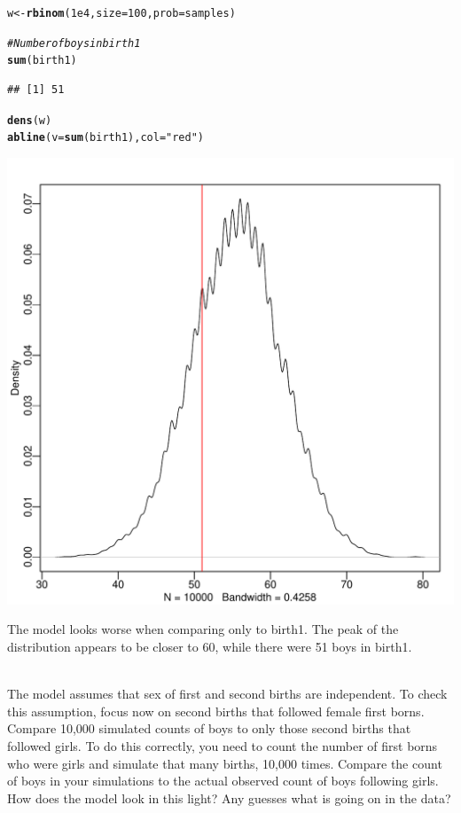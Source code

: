 \documentclass[12pt]{article}\usepackage[]{graphicx}\usepackage[]{color}
\makeatletter
\def\maxwidth{ %
  \ifdim\Gin@nat@width>\linewidth
    \linewidth
  \else
    \Gin@nat@width
  \fi
}
\newcommand{\hlnum}[1]{\textcolor[rgb]{0.686,0.059,0.569}{#1}}%
\newcommand{\hlstr}[1]{\textcolor[rgb]{0.192,0.494,0.8}{#1}}%
\newcommand{\hlcom}[1]{\textcolor[rgb]{0.678,0.584,0.686}{\textit{#1}}}%
\newcommand{\hlstd}[1]{\textcolor[rgb]{0.345,0.345,0.345}{#1}}%
\newcommand{\hlkwb}[1]{\textcolor[rgb]{0.69,0.353,0.396}{#1}}%
\newcommand{\hlkwc}[1]{\textcolor[rgb]{0.333,0.667,0.333}{#1}}%
\newcommand{\hlkwd}[1]{\textcolor[rgb]{0.737,0.353,0.396}{\textbf{#1}}}%
\newenvironment{kframe}{%
 \def\at@end@of@kframe{}%
 \ifinner\ifhmode%
  \def\at@end@of@kframe{\end{minipage}}%
  \begin{minipage}{\columnwidth}%
 \fi\fi%
 \def\FrameCommand##1{\hskip\@totalleftmargin \hskip-\fboxsep
 \colorbox{shadecolor}{##1}\hskip-\fboxsep
     \hskip-\linewidth \hskip-\@totalleftmargin \hskip\columnwidth}%
 \MakeFramed {\advance\hsize-\width
   \@totalleftmargin\z@ \linewidth\hsize
   \@setminipage}}%
 {\par\unskip\endMakeFramed%
 \at@end@of@kframe}
\newenvironment{knitrout}{}{} %
\newenvironment{problem}[2][Problem]{\begin{trivlist}
\item[\hskip \labelsep {\bfseries #1}\hskip \labelsep {\bfseries #2.}]}{\end{trivlist}}
\makeatother
\begin{document}
\begin{knitrout}
\color{fgcolor}\begin{kframe}
\begin{alltt}
\hlstd{w} \hlkwb{<-} \hlkwd{rbinom}\hlstd{(}\hlnum{1e4}\hlstd{,} \hlkwc{size} \hlstd{=} \hlnum{100}\hlstd{,} \hlkwc{prob} \hlstd{= samples)}

\hlcom{#Number of boys in birth1}
\hlkwd{sum}\hlstd{(birth1)}
\end{alltt}
\begin{verbatim}
## [1] 51
\end{verbatim}
\begin{alltt}
\hlkwd{dens}\hlstd{(w)}
\hlkwd{abline}\hlstd{(}\hlkwc{v} \hlstd{=} \hlkwd{sum}\hlstd{(birth1),} \hlkwc{col} \hlstd{=} \hlstr{"red"}\hlstd{)}
\end{alltt}
\end{kframe}
\includegraphics[width=\maxwidth]{figure/unnamed-chunk-20-1} 

\end{knitrout}

The model looks worse when comparing only to birth1. The peak of the distribution appears to be closer to 60, while there were 51 boys in birth1.

\begin{problem}{3H5}
\text{}\\
The model assumes that sex of first and second births are independent. To check this assumption, focus now on second births that followed female first borns. Compare 10,000 simulated counts of boys to only those second births that followed girls. To do this correctly, you need to count the number of first borns who were girls and simulate that many births, 10,000 times. Compare the count of boys in your simulations to the actual observed count of boys following girls. How does the model look in this light? Any guesses what is going on in the data?
\end{problem}
\end{document}
